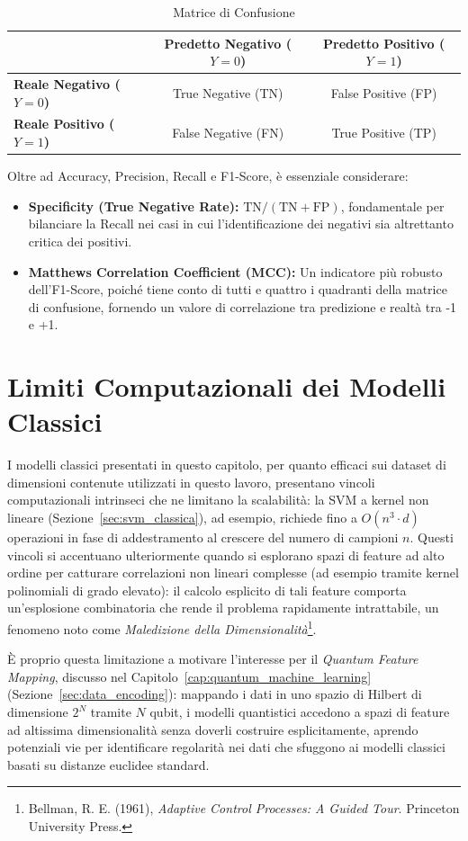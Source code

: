 \begin{table}[h]
\centering
\caption{Matrice di Confusione}
\label{tab:matrice_confusione}
\begin{tabular}{l|c|c}
\hline
& \textbf{Predetto Negativo ($Y=0$)} & \textbf{Predetto Positivo ($Y=1$)} \\
\hline
\textbf{Reale Negativo ($Y=0$)} & True Negative (TN) & False Positive (FP) \\
\textbf{Reale Positivo ($Y=1$)} & False Negative (FN) & True Positive (TP) \\
\hline
\end{tabular}
\end{table}

Oltre ad Accuracy, Precision, Recall e F1-Score, è essenziale considerare:
\begin{itemize}
    \item \textbf{Specificity (True Negative Rate):} $\text{TN} / (\text{TN} + \text{FP})$, fondamentale per bilanciare la Recall nei casi in cui l'identificazione dei negativi sia altrettanto critica dei positivi.
    \item \textbf{Matthews Correlation Coefficient (MCC):} Un indicatore più robusto dell'F1-Score, poiché tiene conto di tutti e quattro i quadranti della matrice di confusione, fornendo un valore di correlazione tra predizione e realtà tra -1 e +1.
\end{itemize}

\section{Limiti Computazionali dei Modelli Classici}

I modelli classici presentati in questo capitolo, per quanto efficaci sui dataset di dimensioni contenute utilizzati in questo lavoro, presentano vincoli computazionali intrinseci che ne limitano la scalabilità: la SVM a kernel non lineare (Sezione~\ref{sec:svm_classica}), ad esempio, richiede fino a $O(n^3 \cdot d)$ operazioni in fase di addestramento al crescere del numero di campioni $n$. Questi vincoli si accentuano ulteriormente quando si esplorano spazi di feature ad alto ordine per catturare correlazioni non lineari complesse (ad esempio tramite kernel polinomiali di grado elevato): il calcolo esplicito di tali feature comporta un'esplosione combinatoria che rende il problema rapidamente intrattabile, un fenomeno noto come \textit{Maledizione della Dimensionalità}\footnote{Bellman, R. E. (1961), \textit{Adaptive Control Processes: A Guided Tour}. Princeton University Press.}.

È proprio questa limitazione a motivare l'interesse per il \textit{Quantum Feature Mapping}, discusso nel Capitolo~\ref{cap:quantum_machine_learning} (Sezione~\ref{sec:data_encoding}): mappando i dati in uno spazio di Hilbert di dimensione $2^N$ tramite $N$ qubit, i modelli quantistici accedono a spazi di feature ad altissima dimensionalità senza doverli costruire esplicitamente, aprendo potenziali vie per identificare regolarità nei dati che sfuggono ai modelli classici basati su distanze euclidee standard.